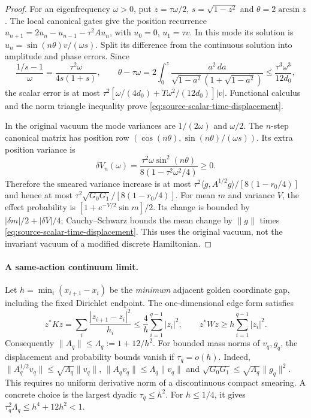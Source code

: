 \begin{proof}
For an eigenfrequency $\omega>0$, put $z=\tau\omega/2$,
$s=\sqrt{1-z^2}$ and $\theta=2\arcsin z$.
The local canonical gates give the position recurrence
$u_{n+1}=2u_n-u_{n-1}-\tau^2Au_n$, with
$u_0=0$, $u_1=\tau v$. In this mode its solution is
$u_n=\sin(n\theta)v/(\omega s)$. Split its difference from the
continuous solution into amplitude and phase errors. Since
\[
 \frac{1/s-1}{\omega}=\frac{\tau^2\omega}{4s(1+s)},\qquad
 \theta-\tau\omega
 =2\int_0^z\frac{a^2\,da}{\sqrt{1-a^2}(1+\sqrt{1-a^2})}
 \le\frac{\tau^3\omega^3}{12d_0},
\]
the scalar error is at most
$\tau^2[\omega/(4d_0)+T\omega^2/(12d_0)]|v|$.
Functional calculus and the norm triangle inequality prove
\eqref{eq:source-scalar-time-displacement}.

In the original vacuum the mode variances are $1/(2\omega)$ and
$\omega/2$. The $n$-step canonical matrix has position row
$(\cos(n\theta),\sin(n\theta)/(\omega s))$. Its extra position variance is
\[
 \delta V_n(\omega)=
 \frac{\tau^2\omega\sin^2(n\theta)}{8(1-\tau^2\omega^2/4)}\ge0.
\]
Therefore the smeared variance increase is at most
$\tau^2\langle g,A^{1/2}g\rangle/[8(1-r_0/4)]$
and hence at most $\tau^2\sqrt{G_0G_1}/[8(1-r_0/4)]$.
For mean $m$ and variance $V$, the effect probability is
$[1+e^{-V/2}\sin m]/2$. Its change is bounded by
$|\delta m|/2+|\delta V|/4$; Cauchy--Schwarz bounds the mean change
by $\|g\|$ times \eqref{eq:source-scalar-time-displacement}.
This uses the original vacuum, not the invariant vacuum of a modified
discrete Hamiltonian.
\end{proof}

\paragraph{A same-action continuum limit.}
Let $h=\min_i(x_{i+1}-x_i)$ be the \emph{minimum} adjacent golden
coordinate gap, including the fixed Dirichlet endpoint. The one-dimensional
edge form satisfies
\[
 z^*Kz=\sum_i\frac{|z_{i+1}-z_i|^2}{h_i}
 \le\frac4h\sum_{i=1}^{q-1}|z_i|^2,
 \qquad z^*Wz\ge h\sum_{i=1}^{q-1}|z_i|^2.
\]
Consequently $\|A_q\|\le\Lambda_q:=1+12/h^2$.
For bounded mass norms of $v_q,g_q$, the displacement and probability
bounds vanish if $\tau_q=o(h)$. Indeed,
$\|A_q^{1/2}v_q\|\le\sqrt{\Lambda_q}\|v_q\|$,
$\|A_qv_q\|\le\Lambda_q\|v_q\|$ and
$\sqrt{G_0G_1}\le\sqrt{\Lambda_q}\|g_q\|^2$.
This requires no uniform derivative norm of a discontinuous compact
smearing. A concrete choice is the largest dyadic $\tau_q\le h^2$.
For $h\le1/4$, it gives $\tau_q^2\Lambda_q\le h^4+12h^2<1$.

